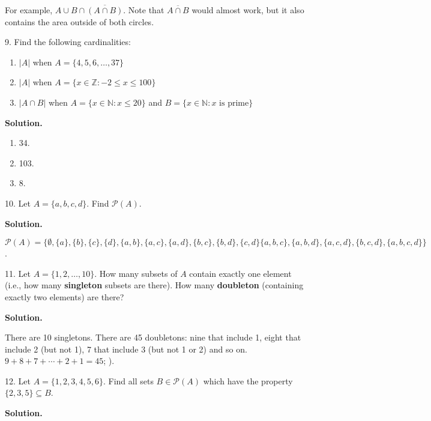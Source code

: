 \documentclass[10pt,]{book}
\newcommand{\terminology}[1]{\textbf{#1}}
\theoremstyle{plain}
\theoremstyle{definition}
\theoremstyle{definition}
\theoremstyle{definition}
\numberwithin{equation}{section}
\def\N{\mathbb N}
\def\Z{\mathbb Z}
\def\pow{\mathcal P}
\def\st{:}
\renewcommand{\bar}{\overline}
\begin{document}
\begin{exerciselist}
          For example, \(A \cup B \cap \bar{(A \cap B)}\). Note that \(\bar{A \cap B}\) would almost work, but it also contains the area outside of both circles.
\item[9.]\hypertarget{exercise-19}{}
          Find the following cardinalities:
\leavevmode%
\begin{enumerate}[label=(\alph*)]
\item\hypertarget{li-270}{}\(|A|\) when \(A = \{4,5,6,\ldots,37\}\)%
\item\hypertarget{li-271}{}\(|A|\) when \(A = \{x \in \Z \st -2 \le x \le 100\}\)%
\item\hypertarget{li-272}{}\(|A \cap B|\) when \(A = \{x \in \N \st x \le 20\}\) and \(B = \{x \in \N \st x \mbox{ is prime} \}\)%
\end{enumerate}
\par\smallskip
\par\smallskip
\noindent\textbf{Solution.}\hypertarget{solution-31}{}\quad
\leavevmode%
\begin{enumerate}[label=(\alph*)]
\item\hypertarget{li-273}{} 34. %
\item\hypertarget{li-274}{} 103. %
\item\hypertarget{li-275}{} 8. %
\end{enumerate}
\item[10.]\hypertarget{exercise-20}{}
          Let \(A = \{a, b, c, d\}\). Find \(\pow(A)\).
\par\smallskip
\par\smallskip
\noindent\textbf{Solution.}\hypertarget{solution-32}{}\quad

          \(\pow(A) = \{\emptyset, \{a\}, \{b\}, \{c\}, \{d\}, \{a,b\}, \{a,c\}, \{a,d\}, \{b,c\}, \{b,d\}, \{c,d\} \{a,b,c\}, \{a,b,d\}, \{a,c,d\}, \{b,c,d\}, \{a,b,c,d\}\}\).
\item[11.]\hypertarget{exercise-21}{}
          Let \(A = \{1,2,\ldots, 10\}\). How many subsets of \(A\) contain exactly one element (i.e., how many \terminology{singleton} subsets are there). How many \terminology{doubleton} (containing exactly two elements) are there?
\par\smallskip
\par\smallskip
\noindent\textbf{Solution.}\hypertarget{solution-33}{}\quad

          There are 10 singletons. There are 45 doubletons: nine that include 1, eight that include 2 (but not 1), 7 that include 3 (but not 1 or 2) and so on. \(9+8+7+\cdots+2+1 = 45\); ).
\item[12.]\hypertarget{exercise-22}{}
          Let \(A = \{1,2,3,4,5,6\}\). Find all sets \(B \in \pow(A)\) which have the property \(\{2,3,5\} \subseteq B\).
\par\smallskip
\par\smallskip
\noindent\textbf{Solution.}\hypertarget{solution-34}{}\quad


\end{exerciselist}
\end{document}
